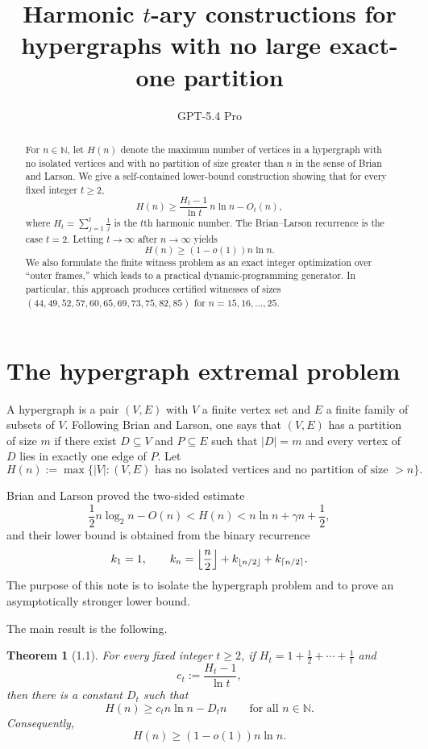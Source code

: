 \documentclass[11pt]{article}
\title{Harmonic $t$-ary constructions for hypergraphs with no large exact-one partition}
\author{GPT-5.4 Pro}
\date{}
\newtheorem{theorem}{Theorem}[section]
\begin{document}
\maketitle

\begin{abstract}
For $n \in \mathbb{N}$, let $H(n)$ denote the maximum number of vertices in a hypergraph with no isolated vertices and with no partition of size greater than $n$ in the sense of Brian and Larson. We give a self-contained lower-bound construction showing that for every fixed integer $t \ge 2$,
\[
H(n) \ge \frac{H_t - 1}{\ln t}\, n \ln n - O_t(n),
\]
where $H_t = \sum_{j=1}^t \frac1j$ is the $t$th harmonic number. The Brian--Larson recurrence is the case $t=2$. Letting $t \to \infty$ after $n \to \infty$ yields
\[
H(n) \ge (1-o(1)) n \ln n.
\]
We also formulate the finite witness problem as an exact integer optimization over ``outer frames,'' which leads to a practical dynamic-programming generator. In particular, this approach produces certified witnesses of sizes $(44,49,52,57,60,65,69,73,75,82,85)$ for $n=15,16,\dots,25$.
\end{abstract}

\section{The hypergraph extremal problem}

A hypergraph is a pair $(V,E)$ with $V$ a finite vertex set and $E$ a finite family of subsets of $V$. Following Brian and Larson, one says that $(V,E)$ has a partition of size $m$ if there exist $D \subseteq V$ and $P \subseteq E$ such that $|D|=m$ and every vertex of $D$ lies in exactly one edge of $P$. Let
\[
H(n) := \max\bigl\{ |V| : (V,E) \text{ has no isolated vertices and no partition of size } > n \bigr\}.
\]

Brian and Larson proved the two-sided estimate
\[
\frac12 n \log_2 n - O(n) < H(n) < n \ln n + \gamma n + \frac12,
\]
and their lower bound is obtained from the binary recurrence
\[
k_1 = 1, \qquad k_n = \Bigl\lfloor \frac n2 \Bigr\rfloor + k_{\lfloor n/2 \rfloor} + k_{\lceil n/2 \rceil}.
\]
The purpose of this note is to isolate the hypergraph problem and to prove an asymptotically stronger lower bound.

The main result is the following.

\begin{theorem}[1.1]
For every fixed integer $t \ge 2$, if $H_t = 1 + \frac12 + \cdots + \frac1t$ and
\[
c_t := \frac{H_t - 1}{\ln t},
\]
then there is a constant $D_t$ such that
\[
H(n) \ge c_t n \ln n - D_t n \qquad \text{for all } n \in \mathbb{N}.
\]
Consequently,
\[
H(n) \ge (1-o(1)) n \ln n.
\]
\end{theorem}
\end{document}

